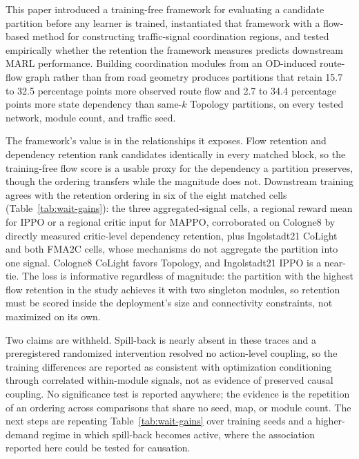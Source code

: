 \documentclass[journal]{IEEEtran}
\theoremstyle{definition}
\begin{document}
This paper introduced a training-free framework for evaluating a candidate partition before any learner is trained, instantiated that framework with a flow-based method for constructing traffic-signal coordination regions, and tested empirically whether the retention the framework measures predicts downstream MARL performance.
Building coordination modules from an OD-induced route-flow graph rather than from road geometry produces partitions that retain 15.7 to 32.5 percentage points more observed route flow and 2.7 to 34.4 percentage points more state dependency than same-$k$ Topology partitions, on every tested network, module count, and traffic seed.

The framework's value is in the relationships it exposes.
Flow retention and dependency retention rank candidates identically in every matched block, so the training-free flow score is a usable proxy for the dependency a partition preserves, though the ordering transfers while the magnitude does not.
Downstream training agrees with the retention ordering in six of the eight matched cells (Table~\ref{tab:wait-gains}): the three aggregated-signal cells, a regional reward mean for IPPO or a regional critic input for MAPPO, corroborated on Cologne8 by directly measured critic-level dependency retention, plus Ingolstadt21 CoLight and both FMA2C cells, whose mechanisms do not aggregate the partition into one signal. Cologne8 CoLight favors Topology, and Ingolstadt21 IPPO is a near-tie. The loss is informative regardless of magnitude: the partition with the highest flow retention in the study achieves it with two singleton modules, so retention must be scored inside the deployment's size and connectivity constraints, not maximized on its own.

Two claims are withheld.
Spill-back is nearly absent in these traces and a preregistered randomized intervention resolved no action-level coupling, so the training differences are reported as consistent with optimization conditioning through correlated within-module signals, not as evidence of preserved causal coupling. No significance test is reported anywhere; the evidence is the repetition of an ordering across comparisons that share no seed, map, or module count. The next steps are repeating Table~\ref{tab:wait-gains} over training seeds and a higher-demand regime in which spill-back becomes active, where the association reported here could be tested for causation.

\end{document}
